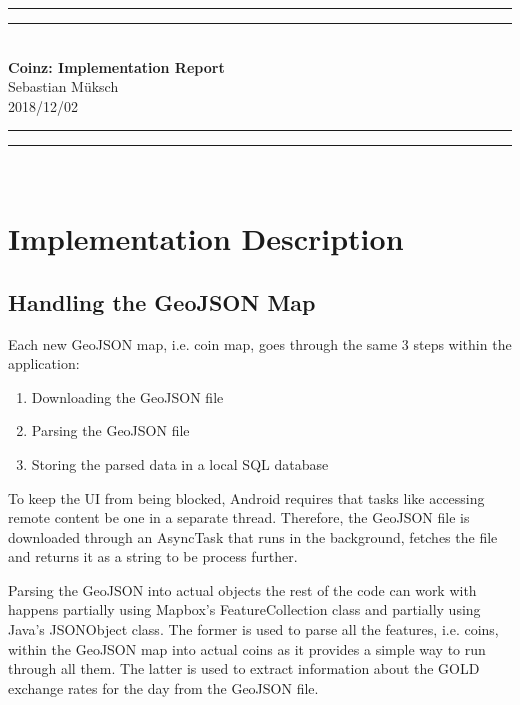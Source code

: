 \documentclass[11pt,a4paper,notitlepage]{article}
\begin{document}
\begin{centering}
\centering
    
    \rule{\textwidth}{1.6pt}\vspace*{-\baselineskip}\vspace*{2pt}
    \rule{\textwidth}{0.4pt}\\[\baselineskip]
    {\LARGE \textbf{Coinz: Implementation Report} \\[0.5\baselineskip] Sebastian Müksch} \\[1\baselineskip]
    {2018/12/02}
    \rule{\textwidth}{0.4pt}\vspace*{-\baselineskip}\vspace{3.2pt}
    \rule{\textwidth}{1.6pt}\\[\baselineskip]
\end{centering}

\tableofcontents
\newpage

\section{Implementation Description}

\subsection{Handling the GeoJSON Map}

    Each new GeoJSON map, i.e. coin map, goes through the same 3 steps within the application:

        \begin{enumerate}
            \item Downloading the GeoJSON file
            \item Parsing the GeoJSON file
            \item Storing the parsed data in a local SQL database
        \end{enumerate}

    To keep the UI from being blocked, Android requires that tasks like accessing remote content be one in a separate thread. Therefore, the GeoJSON file is downloaded through an AsyncTask that runs in the background, fetches the file and returns it as a string to be process further. \cite{async-task}

    Parsing the GeoJSON into actual objects the rest of the code can work with happens partially using Mapbox's FeatureCollection class \cite{feature-collection} and partially using Java's JSONObject class. \cite{json-object} The former is used to parse all the features, i.e. coins, within the GeoJSON map into actual coins as it provides a simple way to run through all them. The latter is used to extract information about the GOLD exchange rates for the day from the GeoJSON file.
\end{document}
